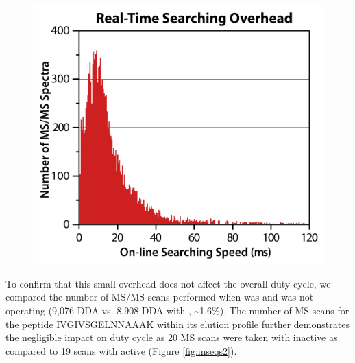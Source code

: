 \begin{figure}[p]
	\centering
	\includegraphics[width=\columnwidth]{inseq/inSeq_Fig S1.png}
	\label{fig:inseqs1}
\end{figure}
To confirm that this small overhead does not affect the overall duty cycle, we compared the number of MS/MS scans performed when \inseq{} was and was not operating (9,076 DDA vs. 8,908 DDA with \inseq{}, \textasciitilde1.6\%). The number of MS scans for the peptide IVGIVSGELNNAAAK within its elution profile further demonstrates the negligible impact on duty cycle as 20 MS scans were taken with \inseq{} inactive as compared to 19 scans with \inseq{} active (Figure \ref{fig:inseqs2}).
